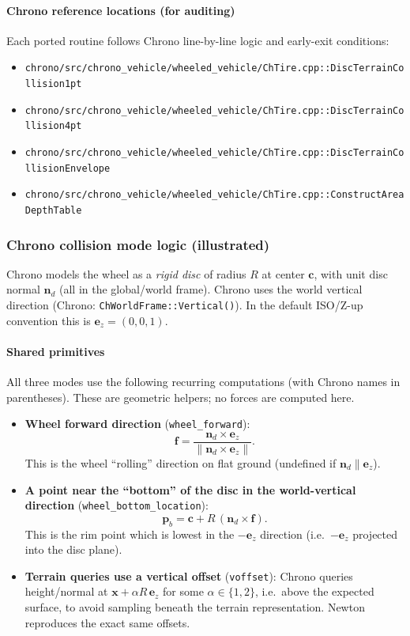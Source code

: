 \paragraph{Chrono reference locations (for auditing)}
Each ported routine follows Chrono line-by-line logic and early-exit conditions:
\begin{itemize}
  \item \texttt{chrono/src/chrono\_vehicle/wheeled\_vehicle/ChTire.cpp::DiscTerrainCollision1pt}
  \item \texttt{chrono/src/chrono\_vehicle/wheeled\_vehicle/ChTire.cpp::DiscTerrainCollision4pt}
  \item \texttt{chrono/src/chrono\_vehicle/wheeled\_vehicle/ChTire.cpp::DiscTerrainCollisionEnvelope}
  \item \texttt{chrono/src/chrono\_vehicle/wheeled\_vehicle/ChTire.cpp::ConstructAreaDepthTable}
\end{itemize}

\subsubsection{Chrono collision mode logic (illustrated)}
Chrono models the wheel as a \emph{rigid disc} of radius \(R\) at center \(\mathbf{c}\), with unit disc normal
\(\mathbf{n}_d\) (all in the global/world frame).
Chrono uses the world vertical direction (Chrono: \texttt{ChWorldFrame::Vertical()}).
In the default ISO/Z-up convention this is \(\mathbf{e}_z = (0,0,1)\).

\paragraph{Shared primitives}
All three modes use the following recurring computations (with Chrono names in parentheses).
These are geometric helpers; no forces are computed here.
\begin{itemize}
  \item \textbf{Wheel forward direction} (\texttt{wheel\_forward}):
    \[
      \mathbf{f} = \frac{\mathbf{n}_d \times \mathbf{e}_z}{\lVert \mathbf{n}_d \times \mathbf{e}_z \rVert}.
    \]
    This is the wheel ``rolling'' direction on flat ground (undefined if \(\mathbf{n}_d\parallel \mathbf{e}_z\)).
  \item \textbf{A point near the ``bottom'' of the disc in the world-vertical direction}
    (\texttt{wheel\_bottom\_location}):
    \[
      \mathbf{p}_b = \mathbf{c} + R\,(\mathbf{n}_d \times \mathbf{f}).
    \]
    This is the rim point which is lowest in the \(-\mathbf{e}_z\) direction (i.e.\ \(-\mathbf{e}_z\) projected into the disc plane).
  \item \textbf{Terrain queries use a vertical offset} (\texttt{voffset}): Chrono queries height/normal at
    \(\mathbf{x} + \alpha R\,\mathbf{e}_z\) for some \(\alpha \in \{1,2\}\), i.e.\ above the expected surface, to
    avoid sampling beneath the terrain representation. Newton reproduces the exact same offsets.
\end{itemize}

